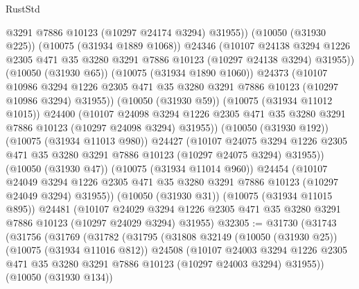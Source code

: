\begin{lexlean}{RustStd}
\begin{coremodule}
                  @3291
                  @7886
                  @10123
                  (@10297 @24174 @3294)
                  @31955))
              (@10050 (@31930 @225))
              (@10075 (@31934 @1889 @1068))
              @24346
              (@10107
                @24138
                @3294
                @1226
                @2305
                @471
                @35
                @3280
                @3291
                @7886
                @10123
                (@10297 @24138 @3294)
                @31955))
            (@10050 (@31930 @65))
            (@10075 (@31934 @1890 @1060))
            @24373
            (@10107
              @10986
              @3294
              @1226
              @2305
              @471
              @35
              @3280
              @3291
              @7886
              @10123
              (@10297 @10986 @3294)
              @31955))
          (@10050 (@31930 @59))
          (@10075 (@31934 @11012 @1015))
          @24400
          (@10107
            @24098
            @3294
            @1226
            @2305
            @471
            @35
            @3280
            @3291
            @7886
            @10123
            (@10297 @24098 @3294)
            @31955))
        (@10050 (@31930 @192))
        (@10075 (@31934 @11013 @980))
        @24427
        (@10107
          @24075
          @3294
          @1226
          @2305
          @471
          @35
          @3280
          @3291
          @7886
          @10123
          (@10297 @24075 @3294)
          @31955))
      (@10050 (@31930 @47))
      (@10075 (@31934 @11014 @960))
      @24454
      (@10107
        @24049
        @3294
        @1226
        @2305
        @471
        @35
        @3280
        @3291
        @7886
        @10123
        (@10297 @24049 @3294)
        @31955))
    (@10050 (@31930 @31))
    (@10075 (@31934 @11015 @895))
    @24481
    (@10107 @24029 @3294 @1226 @2305 @471 @35 @3280 @3291 @7886 @10123 (@10297 @24029 @3294) @31955)
@32305 := @31730
    (@31743
      (@31756
        (@31769
          (@31782
            (@31795
              (@31808
                @32149
                (@10050 (@31930 @25))
                (@10075 (@31934 @11016 @812))
                @24508
                (@10107
                  @24003
                  @3294
                  @1226
                  @2305
                  @471
                  @35
                  @3280
                  @3291
                  @7886
                  @10123
                  (@10297 @24003 @3294)
                  @31955))
              (@10050 (@31930 @134))

\end{coremodule}
\end{lexlean}
